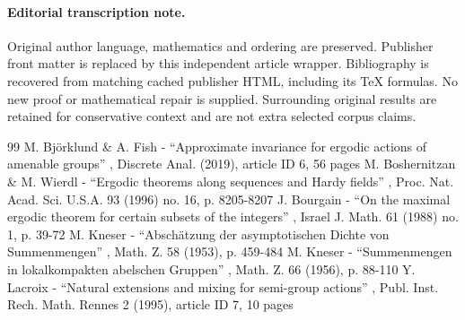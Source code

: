 \documentclass[11pt]{article}
\numberwithin{equation}{section}
\begin{document}
\paragraph{Editorial transcription note.}
Original author language, mathematics and ordering are preserved. Publisher front matter is replaced by this independent article wrapper. Bibliography is recovered from matching cached publisher HTML, including its TeX formulas. No new proof or mathematical repair is supplied. Surrounding original results are retained for conservative context and are not extra selected corpus claims.
\clearpage

\begin{thebibliography}{99}
 M. Björklund \& A. Fish - “Approximate invariance for ergodic actions of amenable groups” , Discrete Anal. (2019), article ID 6, 56 pages
 M. Boshernitzan \& M. Wierdl - “Ergodic theorems along sequences and Hardy fields” , Proc. Nat. Acad. Sci. U.S.A. 93 (1996) no. 16, p. 8205-8207
 J. Bourgain - “On the maximal ergodic theorem for certain subsets of the integers” , Israel J. Math. 61 (1988) no. 1, p. 39-72
 M. Kneser - “Abschätzung der asymptotischen Dichte von Summenmengen” , Math. Z. 58 (1953), p. 459-484
 M. Kneser - “Summenmengen in lokalkompakten abelschen Gruppen” , Math. Z. 66 (1956), p. 88-110
 Y. Lacroix - “Natural extensions and mixing for semi-group actions” , Publ. Inst. Rech. Math. Rennes 2 (1995), article ID 7, 10 pages
\end{thebibliography}
\end{document}
